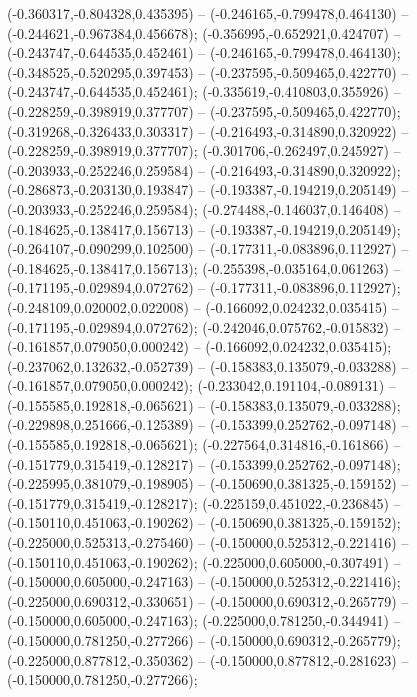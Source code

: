  (-0.360317,-0.804328,0.435395) -- (-0.246165,-0.799478,0.464130) -- (-0.244621,-0.967384,0.456678);
 (-0.356995,-0.652921,0.424707) -- (-0.243747,-0.644535,0.452461) -- (-0.246165,-0.799478,0.464130);
 (-0.348525,-0.520295,0.397453) -- (-0.237595,-0.509465,0.422770) -- (-0.243747,-0.644535,0.452461);
 (-0.335619,-0.410803,0.355926) -- (-0.228259,-0.398919,0.377707) -- (-0.237595,-0.509465,0.422770);
 (-0.319268,-0.326433,0.303317) -- (-0.216493,-0.314890,0.320922) -- (-0.228259,-0.398919,0.377707);
 (-0.301706,-0.262497,0.245927) -- (-0.203933,-0.252246,0.259584) -- (-0.216493,-0.314890,0.320922);
 (-0.286873,-0.203130,0.193847) -- (-0.193387,-0.194219,0.205149) -- (-0.203933,-0.252246,0.259584);
 (-0.274488,-0.146037,0.146408) -- (-0.184625,-0.138417,0.156713) -- (-0.193387,-0.194219,0.205149);
 (-0.264107,-0.090299,0.102500) -- (-0.177311,-0.083896,0.112927) -- (-0.184625,-0.138417,0.156713);
 (-0.255398,-0.035164,0.061263) -- (-0.171195,-0.029894,0.072762) -- (-0.177311,-0.083896,0.112927);
 (-0.248109,0.020002,0.022008) -- (-0.166092,0.024232,0.035415) -- (-0.171195,-0.029894,0.072762);
 (-0.242046,0.075762,-0.015832) -- (-0.161857,0.079050,0.000242) -- (-0.166092,0.024232,0.035415);
 (-0.237062,0.132632,-0.052739) -- (-0.158383,0.135079,-0.033288) -- (-0.161857,0.079050,0.000242);
 (-0.233042,0.191104,-0.089131) -- (-0.155585,0.192818,-0.065621) -- (-0.158383,0.135079,-0.033288);
 (-0.229898,0.251666,-0.125389) -- (-0.153399,0.252762,-0.097148) -- (-0.155585,0.192818,-0.065621);
 (-0.227564,0.314816,-0.161866) -- (-0.151779,0.315419,-0.128217) -- (-0.153399,0.252762,-0.097148);
 (-0.225995,0.381079,-0.198905) -- (-0.150690,0.381325,-0.159152) -- (-0.151779,0.315419,-0.128217);
 (-0.225159,0.451022,-0.236845) -- (-0.150110,0.451063,-0.190262) -- (-0.150690,0.381325,-0.159152);
 (-0.225000,0.525313,-0.275460) -- (-0.150000,0.525312,-0.221416) -- (-0.150110,0.451063,-0.190262);
 (-0.225000,0.605000,-0.307491) -- (-0.150000,0.605000,-0.247163) -- (-0.150000,0.525312,-0.221416);
 (-0.225000,0.690312,-0.330651) -- (-0.150000,0.690312,-0.265779) -- (-0.150000,0.605000,-0.247163);
 (-0.225000,0.781250,-0.344941) -- (-0.150000,0.781250,-0.277266) -- (-0.150000,0.690312,-0.265779);
 (-0.225000,0.877812,-0.350362) -- (-0.150000,0.877812,-0.281623) -- (-0.150000,0.781250,-0.277266);

